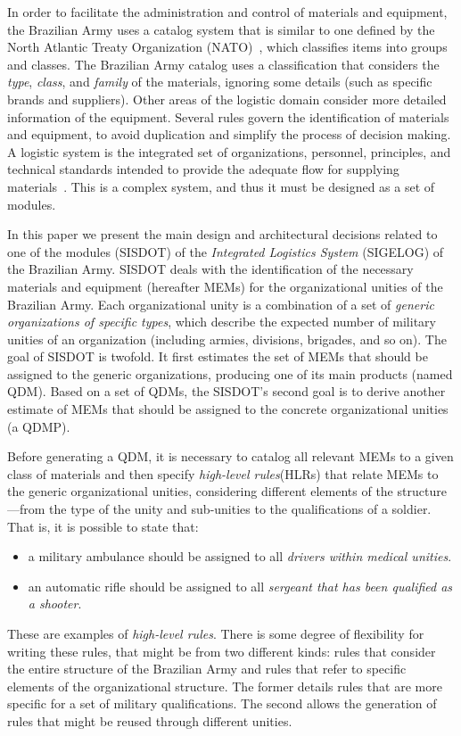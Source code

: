 \documentclass[AMA,STIX1COL]{WileyNJD-v2}
\newcommand{\callers}{\emph{high-level rules}\xspace}
\begin{document}
In order to facilitate the administration and control of materials and equipment, the Brazilian Army uses a catalog system that is similar to one defined by the North Atlantic Treaty Organization (NATO)~\cite{otan2012}, which classifies items into groups and classes. The Brazilian Army catalog uses a classification that considers the \emph{type}, \emph{class}, and \emph{family} of the materials, ignoring some details (such as specific brands and suppliers). Other areas of the logistic domain consider more detailed information of the equipment. Several rules govern the identification of materials and equipment, to avoid duplication and simplify the process of decision making. A logistic system is the integrated set of organizations, personnel, principles, and technical standards intended to provide the adequate flow for supplying materials~\cite{brasil2003}. This is a complex system, and thus it must be designed as a set of modules. 

In this paper we present the main design and architectural decisions related to one of the modules (SISDOT) of the \emph{Integrated Logistics System} (SIGELOG) of the Brazilian Army. SISDOT deals with the identification of the necessary materials and equipment (hereafter MEMs) for the organizational unities of the Brazilian Army. Each organizational unity is a combination of a set of \emph{generic organizations of specific types}, which describe the expected number of military unities of an organization (including armies, divisions, brigades, and so on). The goal of SISDOT is twofold. It first estimates the set of MEMs that should be assigned to the generic organizations, producing one of its main products (named QDM). Based on a set of QDMs, the SISDOT's second goal is to derive another estimate of MEMs that should be assigned to the concrete organizational unities (a QDMP). 

{\color{blue}
Before generating a QDM, it is necessary to catalog all relevant MEMs to a given class of materials and then specify \callers (HLRs) that relate MEMs to the generic organizational unities, considering different elements of the structure---from the type of the unity and sub-unities to the qualifications of a soldier. That is, it is possible to state that:

\begin{itemize}
 \item a military ambulance should be assigned to all \emph{drivers within medical unities}.
 \item an automatic rifle should be assigned to all \emph{sergeant that has been qualified as a shooter}.
\end{itemize}

These are examples of \callers. There is some degree of flexibility for writing these rules, that might be from two different kinds: rules that consider the entire structure of the Brazilian Army and rules that refer to specific elements of the organizational structure. The former details rules that are more specific for a set of military qualifications. The second allows the generation of rules that might be reused through different unities.}
\end{document}

